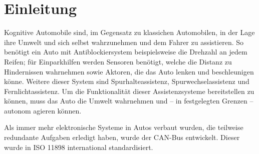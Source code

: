 
\section{Einleitung}
Kognitive Automobile sind, im Gegensatz zu klassichen Automobilen, in der Lage
ihre Umwelt und sich selbst wahrzunehmen und dem Fahrer zu assistieren. So
benötigt ein Auto mit Antiblockiersystem beispielsweise die Drehzahl an jedem
Reifen; für Einparkhilfen werden Sensoren benötigt, welche die Distanz zu
Hindernissen wahrnehmen sowie Aktoren, die das Auto lenken und beschleunigen
könne. Weitere dieser System sind Spurhalteassistenz, Spurwechselassistenz und
Fernlichtassistenz. Um die Funktionalität dieser Assistenzsysteme bereitstellen
zu können, muss das Auto die Umwelt wahrnehmen und -- in festgelegten Grenzen
-- autonom agieren können.

Als immer mehr elektronische Systeme in Autos verbaut wurden, die teilweise
redundante Aufgaben erledigt haben, wurde der CAN-Bus
entwickelt\cite{Kiencke1986}. Dieser wurde in ISO 11898 international
standardisiert.
